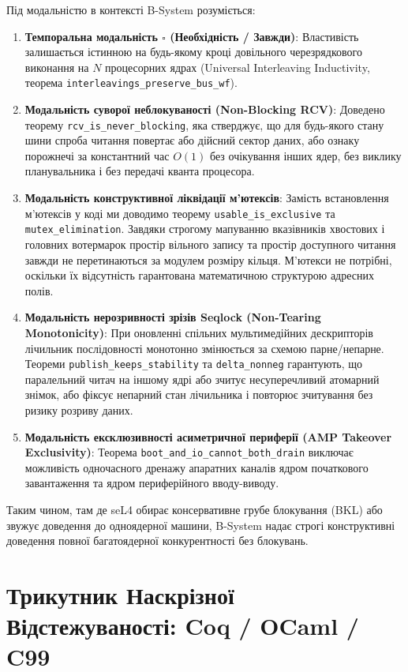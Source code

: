 \documentclass{article}
\begin{document}
Під модальністю в контексті B-System розуміється:
\begin{enumerate}
  \item \textbf{Темпоральна модальність $\square$ (Необхідність / Завжди)}: Властивість залишається істинною на будь-якому кроці довільного черезрядкового виконання на $N$ процесорних ядрах (Universal Interleaving Inductivity, теорема \texttt{interleavings\_preserve\_bus\_wf}).
  \item \textbf{Модальність суворої неблокуваності (Non-Blocking RCV)}: Доведено теорему \texttt{rcv\_is\_never\_blocking}, яка стверджує, що для будь-якого стану шини спроба читання повертає або дійсний сектор даних, або ознаку порожнечі за константний час $O(1)$ без очікування інших ядер, без виклику планувальника і без передачі кванта процесора.
  \item \textbf{Модальність конструктивної ліквідації м'ютексів}: Замість встановлення м'ютексів у коді ми доводимо теорему \texttt{usable\_is\_exclusive} та \texttt{mutex\_elimination}. Завдяки строгому мапуванню вказівників хвостових і головних вотермарок простір вільного запису та простір доступного читання завжди не перетинаються за модулем розміру кільця. М'ютекси не потрібні, оскільки їх відсутність гарантована математичною структурою адресних полів.
  \item \textbf{Модальність нерозривності зрізів Seqlock (Non-Tearing Monotonicity)}: При оновленні спільних мультимедійних дескрипторів лічильник послідовності монотонно змінюється за схемою парне/непарне. Теореми \texttt{publish\_keeps\_stability} та \texttt{delta\_nonneg} гарантують, що паралельний читач на іншому ядрі або зчитує несуперечливий атомарний знімок, або фіксує непарний стан лічильника і повторює зчитування без ризику розриву даних.
  \item \textbf{Модальність ексклюзивності асиметричної периферії (AMP Takeover Exclusivity)}: Теорема \texttt{boot\_and\_io\_cannot\_both\_drain} виключає можливість одночасного дренажу апаратних каналів ядром початкового завантаження та ядром периферійного вводу-виводу.
\end{enumerate}

Таким чином, там де seL4 обирає консервативне грубе блокування (BKL) або звужує доведення до одноядерної машини, B-System надає строгі конструктивні доведення повної багатоядерної конкурентності без блокувань.

\section{Трикутник Наскрізної Відстежуваності: Coq / OCaml / C99}
\end{document}
